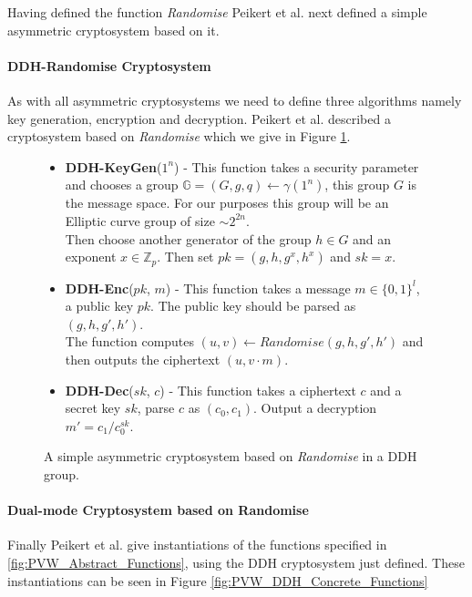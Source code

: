 \documentclass[ %
                    author={Nicholas Tutte},
                supervisor={Prof. Nigel Smart},
                    degree={MEng},
                     title={Secure Two Party Computation},
                  subtitle={A practical comparison of recent protocols},
                      type={Research - GG1K},
                      year={2015} ]{dissertation}
\begin{document}
					Having defined the function \emph{Randomise} Peikert et al. next defined a simple asymmetric cryptosystem based on it.

					\paragraph{DDH-Randomise Cryptosystem} As with all asymmetric cryptosystems we need to define three algorithms namely key generation, encryption and decryption. Peikert et al. described a cryptosystem based on \emph{Randomise} which we give in Figure \ref{fig:DDH_Cryptosystem}.

					\begin{figure}[!htb]
						\begin{mdframed}
							\centering
							\begin{itemize}
								\item \textbf{DDH-KeyGen}($1^n$) - This function takes a security parameter and chooses a group $\mathbb{G} = (G, g, q) \leftarrow \gamma(1^n)$, this group $G$ is the message space. For our purposes this group will be an Elliptic curve group of size $\sim2^{2n}$.\\[0.25cm]

								Then choose another generator of the group $h \in G$ and an exponent $x \in \mathbb{Z}_p$. Then set $pk = (g, h, g^x, h^x)$ and $sk = x$. 

								\item \textbf{DDH-Enc}($pk$, $m$) - This function takes a message $m \in \{0, 1\}^l$, a public key $pk$. The public key should be parsed as $(g, h, g', h')$.\\[0.25cm]

								The function computes $(u, v) \leftarrow Randomise(g, h, g', h')$ and then outputs the ciphertext $(u, v \cdot m)$.

								\item \textbf{DDH-Dec}($sk$, $c$) - This function takes a ciphertext $c$ and a secret key $sk$, parse $c$ as $(c_0, c_1)$. Output a decryption $m' = c_1 / c_0^{sk}$.

							\end{itemize}
						\end{mdframed}

						\caption{A simple asymmetric cryptosystem based on \emph{Randomise} in a DDH group.   \label{fig:DDH_Cryptosystem}}
					\end{figure}


					\paragraph{Dual-mode Cryptosystem based on Randomise} Finally Peikert et al. give instantiations of the functions specified in \ref{fig:PVW_Abstract_Functions}, using the DDH cryptosystem just defined. These instantiations can be seen in Figure \ref{fig:PVW_DDH_Concrete_Functions}\\
\end{document}
